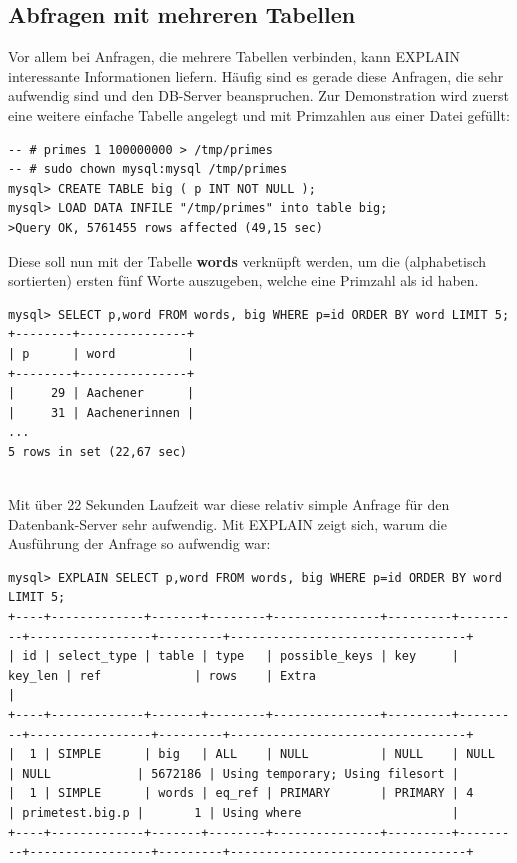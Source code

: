 \subsection{Abfragen mit mehreren Tabellen}
Vor allem bei Anfragen, die mehrere Tabellen verbinden, kann EXPLAIN interessante Informationen liefern. Häufig sind es gerade diese Anfragen, die sehr aufwendig sind und den DB-Server beanspruchen.
Zur Demonstration wird zuerst eine weitere einfache Tabelle angelegt und mit Primzahlen aus einer Datei gefüllt:
\begin{lstlisting}[caption=Anlegen einer primitiven Tabelle mit Primzahlen]
-- # primes 1 100000000 > /tmp/primes
-- # sudo chown mysql:mysql /tmp/primes
mysql> CREATE TABLE big ( p INT NOT NULL );
mysql> LOAD DATA INFILE "/tmp/primes" into table big;
>Query OK, 5761455 rows affected (49,15 sec)
\end{lstlisting}
Diese soll nun mit der Tabelle \textbf{words} verknüpft werden, um die (alphabetisch sortierten) ersten fünf Worte auszugeben, welche eine Primzahl als id haben.\\
\begin{minipage}{\linewidth}
\begin{lstlisting}[caption=Abfrage von zwei verknüpften Tabellen (Join)]
mysql> SELECT p,word FROM words, big WHERE p=id ORDER BY word LIMIT 5;
+--------+---------------+
| p      | word          |
+--------+---------------+
|     29 | Aachener      |
|     31 | Aachenerinnen |
...
5 rows in set (22,67 sec)
\end{lstlisting}
\end{minipage}
\\Mit über 22 Sekunden Laufzeit war diese relativ simple Anfrage für den Datenbank-Server sehr aufwendig.
Mit EXPLAIN zeigt sich, warum die Ausführung der Anfrage so aufwendig war:
\begin{lstlisting}[basicstyle=\ttfamily\tiny,caption=Ausführungsplan ohne Optimierung]
mysql> EXPLAIN SELECT p,word FROM words, big WHERE p=id ORDER BY word LIMIT 5;
+----+-------------+-------+--------+---------------+---------+---------+-----------------+---------+---------------------------------+
| id | select_type | table | type   | possible_keys | key     | key_len | ref             | rows    | Extra                           |
+----+-------------+-------+--------+---------------+---------+---------+-----------------+---------+---------------------------------+
|  1 | SIMPLE      | big   | ALL    | NULL          | NULL    | NULL    | NULL            | 5672186 | Using temporary; Using filesort |
|  1 | SIMPLE      | words | eq_ref | PRIMARY       | PRIMARY | 4       | primetest.big.p |       1 | Using where                     |
+----+-------------+-------+--------+---------------+---------+---------+-----------------+---------+---------------------------------+
\end{lstlisting}
